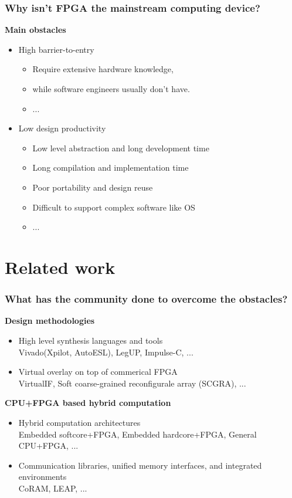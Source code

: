 \documentclass{beamer}
\begin{document}
\begin{frame}[t]

\frametitle{Why isn't FPGA the mainstream computing device?}
\textbf{Main obstacles}
\begin{itemize}

\item High barrier-to-entry
\begin{itemize}
\item Require extensive hardware knowledge,
\item while software engineers usually don't have.
\item ...
\end{itemize}

\item Low design productivity
\begin{itemize}
\item Low level abstraction and long development time
\item Long compilation and implementation time
\item Poor portability and design reuse
\item Difficult to support complex software like OS
\item ...
\end{itemize}

\end{itemize}

\end{frame}

\section{Related work}
\begin{frame}[t]
\frametitle{What has the community done to overcome the obstacles?}

\textbf{Design methodologies}
\begin{itemize}
\item High level synthesis languages and tools \\
\footnotesize
Vivado(Xpilot, AutoESL), LegUP, Impulse-C, ...
\normalsize
\item Virtual overlay on top of commerical FPGA \\
\footnotesize 
VirtualIF, Soft coarse-grained reconfigurale array (SCGRA), ...
\normalsize

\end{itemize}

\textbf{CPU+FPGA based hybrid computation}
\begin{itemize}
\item Hybrid computation architectures \\
\footnotesize
Embedded softcore+FPGA, Embedded hardcore+FPGA, General CPU+FPGA, ...
\normalsize
\item Communication libraries, unified memory interfaces, and integrated environments \\
\footnotesize
CoRAM, LEAP, ...
\normalsize
\end{itemize}

\end{frame}
\end{document}
